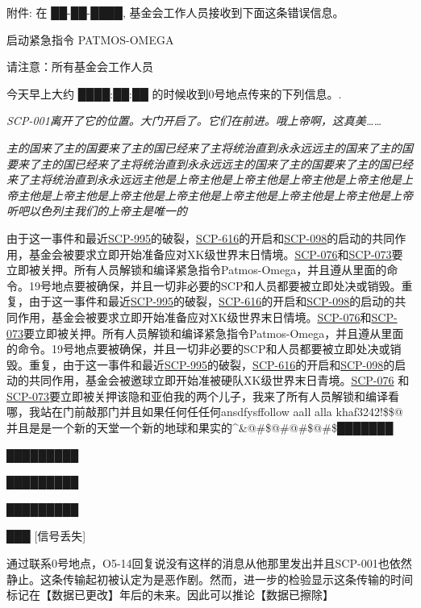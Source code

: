 \documentclass[openany,a4paper]{book} %
\begin{document}
附件: 在 ██-██-████, 基金会工作人员接收到下面这条错误信息。\vspace{12pt}

启动紧急指令 PATMOS-OMEGA

请注意：所有基金会工作人员

今天早上大约 ████:██:██ 的时候收到0号地点传来的下列信息。.

\textit{SCP-001离开了它的位置。大门开启了。它们在前进。哦上帝啊，这真美……}

\textit{主的国来了主的国要来了主的国已经来了主将统治直到永永远远主的国来了主的国要来了主的国已经来了主将统治直到永永远远主的国来了主的国要来了主的国已经来了主将统治直到永永远远主他是上帝主他是上帝主他是上帝主他是上帝主他是上帝主他是上帝主他是上帝主他是上帝主他是上帝主他是上帝主他是上帝主他是上帝听吧以色列主我们的上帝主是唯一的}\vspace{12pt}

由于这一事件和最近\hyperref[chap:SCP-995]{SCP-995}的破裂，\hyperref[chap:SCP-616]{SCP-616}的开启和\hyperref[chap:SCP-098]{SCP-098}的启动的共同作用，基金会被要求立即开始准备应对XK级世界末日情境。\hyperref[chap:SCP-076]{SCP-076}和\hyperref[chap:SCP-073]{SCP-073}要立即被关押。所有人员解锁和编译紧急指令Patmos-Omega，并且遵从里面的命令。19号地点要被确保，并且一切非必要的SCP和人员都要被立即处决或销毁。重复，由于这一事件和最近\hyperref[chap:SCP-995]{SCP-995}的破裂，\hyperref[chap:SCP-616]{SCP-616}的开启和\hyperref[chap:SCP-098]{SCP-098}的启动的共同作用，基金会被要求立即开始准备应对XK级世界末日情境。\hyperref[chap:SCP-076]{SCP-076}和\hyperref[chap:SCP-073]{SCP-073}要立即被关押。所有人员解锁和编译紧急指令Patmos-Omega，并且遵从里面的命令。19号地点要被确保，并且一切非必要的SCP和人员都要被立即处决或销毁。重复，由于这一事件和最近\hyperref[chap:SCP-995]{SCP-995}的破裂，\hyperref[chap:SCP-616]{SCP-616}的开启和\hyperref[chap:SCP-098]{SCP-098}的启动的共同作用，基金会被邀球立即开始准被硬队XK级世界末日青境。\hyperref[chap:SCP-076]{SCP-076} 和\hyperref[chap:SCP-073]{SCP-073}要立即被关押该隐和亚伯我的两个儿子，我来了所有人员解锁和编译看哪，我站在门前敲那门并且如果任何任任何ansdfysffollow aall alla khaf3242!\$\$@并且是是一个新的天堂一个新的地球和果实的\^{}\&@\#\$@\#@\#\$@\#\$███████

█████████

█████████

█████████

███ [信号丢失]\vspace{12pt}

通过联系0号地点，O5-14回复说没有这样的消息从他那里发出并且SCP-001也依然静止。这条传输起初被认定为是恶作剧。然而，进一步的检验显示这条传输的时间标记在【数据已更改】年后的未来。因此可以推论【数据已擦除】
\end{document}
